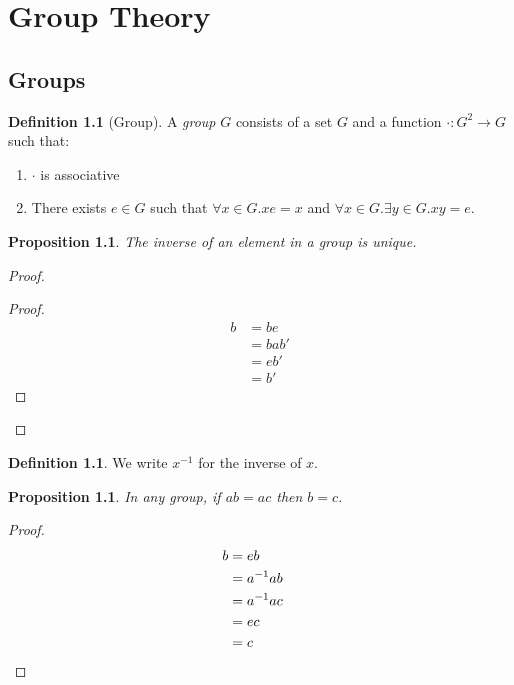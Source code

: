 \documentclass{book}
\let\qed\relax
\newtheorem{prop}[ax]{Proposition}
\theoremstyle{definition}
\newtheorem{df}[ax]{Definition}
\begin{document}
\chapter{Group Theory}

\section{Groups}

\begin{df}[Group]
A \emph{group} $G$ consists of a set $G$ and a function $\cdot : G^2 \rightarrow G$ such that:
\begin{enumerate}
\item $\cdot$ is associative
\item There exists $e \in G$ such that $\forall x \in G. xe = x$ and $\forall x \in G. \exists y \in G. xy = e$.
\end{enumerate}
\end{df}

\begin{prop}
The inverse of an element in a group is unique.
\end{prop}

\begin{proof}
\pf
{}
\begin{proof}
	\pf
	\begin{align*}
		b & = be \\
		& = bab' \\
		& = eb' \\
		& = b'
	\end{align*}
\end{proof}
\qed
\end{proof}

\begin{df}
We write $x^{-1}$ for the inverse of $x$.
\end{df}

\begin{prop}
\label{prop:groupcancel}
In any group, if $ab = ac$ then $b = c$.
\end{prop}

\begin{proof}
\pf
\begin{align*}
b & = eb \\
& = a^{-1}ab \\
& = a^{-1}ac \\
& = ec \\
& = c & \qed
\end{align*}
\end{proof}
\end{document}
